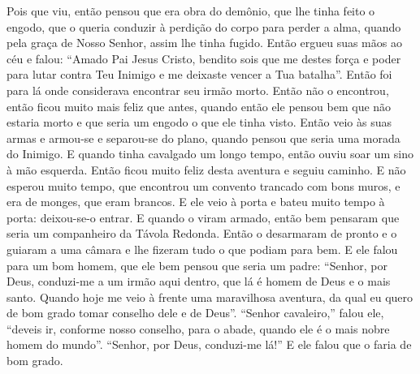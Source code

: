 Pois que viu, então pensou que era obra do demônio, que lhe tinha feito o
engodo, que o queria conduzir à perdição do corpo para perder a alma, quando
pela graça de Nosso Senhor, assim lhe tinha fugido. Então ergueu suas mãos ao
céu e falou: “Amado Pai Jesus Cristo, bendito sois que me destes força e poder
para lutar contra Teu Inimigo e me deixaste vencer a Tua batalha”. Então foi
para lá onde considerava encontrar seu irmão morto. Então não o encontrou,
então ficou muito mais feliz que antes, quando então ele pensou bem que não
estaria morto e que seria um engodo o que ele tinha visto. Então veio às suas
armas e armou-se e separou-se do plano, quando pensou que seria uma morada do
Inimigo. E quando tinha cavalgado um longo tempo, então ouviu soar um sino à
mão esquerda. Então ficou muito feliz desta aventura e seguiu caminho. E não
esperou muito tempo, que encontrou um convento trancado com bons muros, e era
de monges, que eram brancos. E ele veio à porta e bateu muito tempo à porta:
deixou-se-o entrar. E quando o viram armado, então bem pensaram que seria um
companheiro da Távola Redonda. Então o desarmaram de pronto e o guiaram a uma
câmara e lhe fizeram tudo o que podiam para bem. E ele falou para um bom homem,
que ele bem pensou que seria um padre: “Senhor, por Deus, conduzi-me a um irmão
aqui dentro, que lá é homem de Deus e o mais santo. Quando hoje me veio à
frente uma maravilhosa aventura, da qual eu quero de bom grado tomar conselho
dele e de Deus”. “Senhor cavaleiro,” falou ele, “deveis ir, conforme nosso
conselho, para o abade, quando ele é o mais nobre homem do mundo”. “Senhor, por
Deus, conduzi-me lá!” E ele falou que o faria de bom grado.

